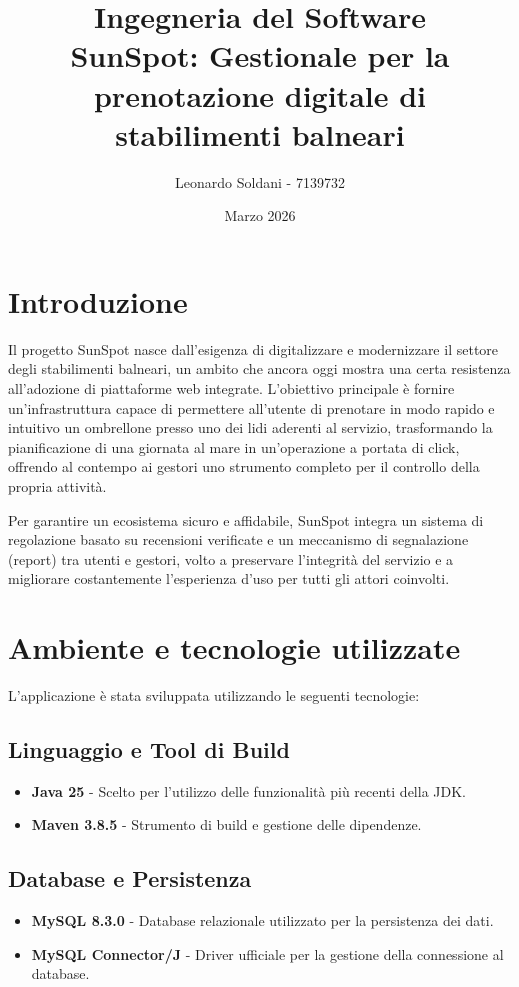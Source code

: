 \documentclass[a4paper,11pt]{article}
\title{Ingegneria del Software\\ \Large SunSpot: Gestionale per la prenotazione digitale di stabilimenti balneari}
\author{Leonardo Soldani - 7139732}
\date{Marzo 2026}
\begin{document}
\maketitle

\renewcommand{\contentsname}{Indice}
\tableofcontents
\newpage

\pagestyle{plain}
\setcounter{page}{1}

\section{Introduzione}
Il progetto SunSpot nasce dall'esigenza di digitalizzare e modernizzare il settore degli stabilimenti balneari, un ambito che ancora oggi mostra una certa resistenza all'adozione di piattaforme web integrate. L'obiettivo principale è fornire un'infrastruttura capace di permettere all'utente di prenotare in modo rapido e intuitivo un ombrellone presso uno dei lidi aderenti al servizio, trasformando la pianificazione di una giornata al mare in un'operazione a portata di click, offrendo al contempo ai gestori uno strumento completo per il controllo della propria attività.

Per garantire un ecosistema sicuro e affidabile, SunSpot integra un sistema di regolazione basato su recensioni verificate e un meccanismo di segnalazione (report) tra utenti e gestori, volto a preservare l'integrità del servizio e a migliorare costantemente l'esperienza d'uso per tutti gli attori coinvolti.

\section{Ambiente e tecnologie utilizzate}
L'applicazione è stata sviluppata utilizzando le seguenti tecnologie:

\subsection{Linguaggio e Tool di Build}
\begin{itemize}
    \item \textbf{Java 25} - Scelto per l'utilizzo delle funzionalità più recenti della JDK.
    \item \textbf{Maven 3.8.5} - Strumento di build e gestione delle dipendenze.
\end{itemize}

\subsection{Database e Persistenza}
\begin{itemize}
    \item \textbf{MySQL 8.3.0} - Database relazionale utilizzato per la persistenza dei dati.
    \item \textbf{MySQL Connector/J} - Driver ufficiale per la gestione della connessione al database.
\end{itemize}
\end{document}
